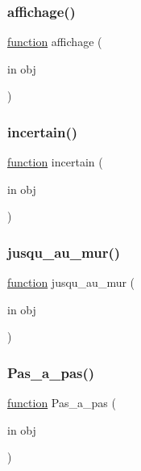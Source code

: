 \subsubsection{\texorpdfstring{affichage()}{affichage()}}
{\footnotesize\ttfamily \hyperlink{_plan__desuma_functions_8m_ac2ffb26d6f42d3bbcd7847b0873403f4}{function} affichage (\begin{DoxyParamCaption}\item[{in}]{obj }\end{DoxyParamCaption})}

\mbox{\label{class_labyrinthe_a6ca8be288490170254d0df6579a59ee3}} 
\subsubsection{\texorpdfstring{incertain()}{incertain()}}
{\footnotesize\ttfamily \hyperlink{_plan__desuma_functions_8m_ac2ffb26d6f42d3bbcd7847b0873403f4}{function} incertain (\begin{DoxyParamCaption}\item[{in}]{obj }\end{DoxyParamCaption})}

\mbox{\label{class_labyrinthe_a7b95620bd4b1d31b6d76a5d1a0a4c422}} 
\subsubsection{\texorpdfstring{jusqu\+\_\+au\+\_\+mur()}{jusqu\_au\_mur()}}
{\footnotesize\ttfamily \hyperlink{_plan__desuma_functions_8m_ac2ffb26d6f42d3bbcd7847b0873403f4}{function} jusqu\+\_\+au\+\_\+mur (\begin{DoxyParamCaption}\item[{in}]{obj }\end{DoxyParamCaption})}

\mbox{\label{class_labyrinthe_a83ffa74a2a322b1866e7366623a7c4e0}} 
\subsubsection{\texorpdfstring{Pas\+\_\+a\+\_\+pas()}{Pas\_a\_pas()}}
{\footnotesize\ttfamily \hyperlink{_plan__desuma_functions_8m_ac2ffb26d6f42d3bbcd7847b0873403f4}{function} Pas\+\_\+a\+\_\+pas (\begin{DoxyParamCaption}\item[{in}]{obj }\end{DoxyParamCaption})}



